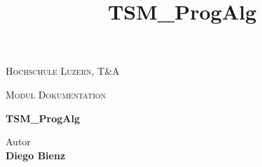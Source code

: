 
\begin{center}
\vspace{1.5cm}
{\scshape\LARGE Hochschule Luzern, T\&A \par}
{\scshape\Large Modul Dokumentation\par}
\vspace{2.0cm}
\title{TSM\_ProgAlg}
{\huge\bfseries TSM\_ProgAlg\par}

\vspace{16.0cm}

\end{center}

Autor \\
\textbf{Diego Bienz} \\


